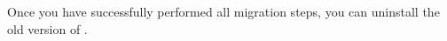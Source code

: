 Once you have successfully performed all migration steps, you can uninstall the old version of \app{}. 
